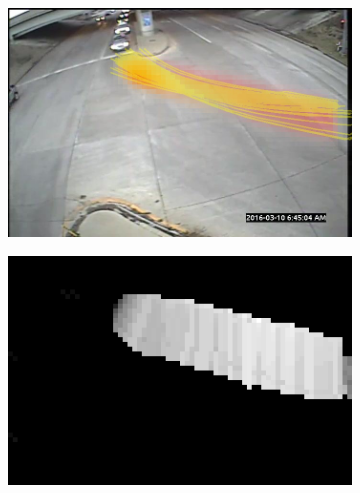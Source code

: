 \begin{figure}
\centering
    \begin{subfigure}{0.32\linewidth}
        \includegraphics[width=\linewidth]{./img/scene_learning/ridges-1.jpg}
        \subcaption{}
        \label{subfig:scene-ridges}
    \end{subfigure}
    \begin{subfigure}{0.32\linewidth}
        \includegraphics[width=\linewidth]{img/scene_learning/perp_width-1.png}
        \subcaption{}
        \label{subfig:scene-perp-width}
    \end{subfigure}
    \begin{subfigure}{0.32\linewidth}

\end{subfigure}
\end{figure}
